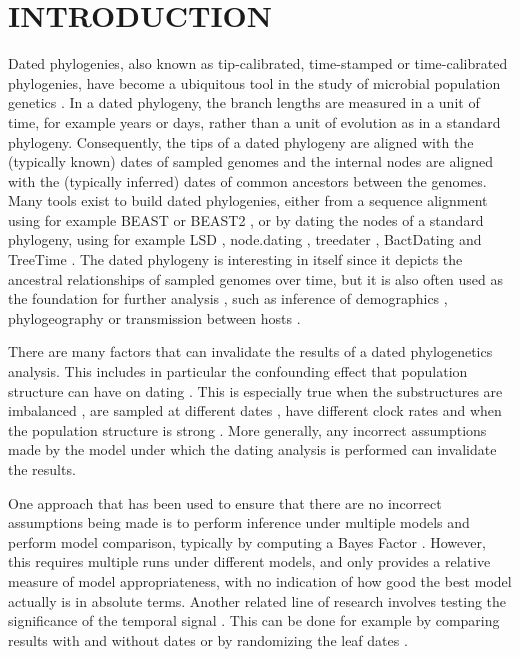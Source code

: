 \documentclass{article}
\begin{document}
\newpage
\section*{INTRODUCTION}

Dated phylogenies, also known as tip-calibrated, time-stamped or time-calibrated phylogenies, have become a ubiquitous tool in the study of microbial population genetics 
\citep{Drummond2003,Biek2015,rieuxInferencesTipcalibratedPhylogenies2016}. In a dated phylogeny, the branch lengths are measured in a unit of time, for example years or days,
rather than a unit of evolution as in a standard phylogeny. Consequently, the tips of a dated phylogeny are aligned with the (typically known) dates of sampled genomes and
the internal nodes are aligned with the (typically inferred) dates of common ancestors between the genomes.
Many tools exist to build dated phylogenies, either from a sequence alignment using for example BEAST \citep{Suchard2018} or BEAST2 \citep{Bouckaert2019}, or by
dating the nodes of a standard phylogeny, using for example 
LSD \citep{To2016}, node.dating \citep{Jones2017}, treedater \citep{Volz2017}, BactDating \citep{Didelot2018} and TreeTime \citep{Sagulenko2018}.
The dated phylogeny is interesting in itself since it depicts the ancestral relationships of sampled genomes
over time, but it is also often used as the foundation for further analysis \citep{Didelot2022}, such as inference
of demographics \citep{Baele2016}, phylogeography \citep{Lemey2009} 
or transmission between hosts \citep{Didelot2017}.

There are many factors that can invalidate the results of a dated phylogenetics analysis.
This includes in particular the confounding effect that population structure can have on dating 
\citep{Duchene2015a,Murray2016}. This is especially true when the substructures are 
imbalanced \citep{ducheneTreeImbalanceCauses2015}, are sampled
at different dates \citep{tongComparisonMethodsEstimating2018}, have different clock rates
\citep{wertheimInconsistenciesEstimatingAge2012}  and when the population structure is strong 
\citep{navascuesElevatedSubstitutionRate2009}. 
More generally, any incorrect assumptions made by the model under which the dating analysis is performed
can invalidate the results.

One approach that has been used to ensure that there are no incorrect assumptions being made 
is to perform inference under multiple models and perform model comparison,
typically by computing a Bayes Factor \citep{Baele2012,Li2012,bouckaertBModelTestBayesianPhylogenetic2017}. 
However, this requires multiple runs under different models, and only provides a relative measure
of model appropriateness, with no indication of how good the best model actually is in absolute terms.
Another related line of research involves testing the significance of the temporal signal 
\citep{Duchene2015a,Duchene2020}. This can be done for example by 
comparing results with and without dates \citep{Rambaut2000} or by 
randomizing the leaf dates \citep{Duchene2015a}. 
\end{document}
